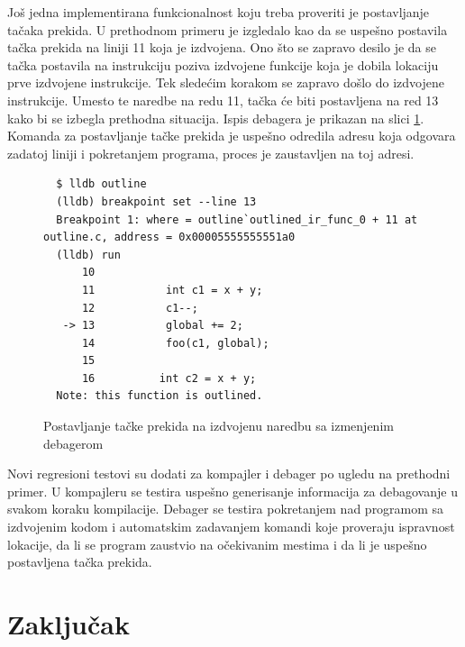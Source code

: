 \documentclass[12pt,oneside]{memoir}
\begin{document}
Još jedna implementirana funkcionalnost koju treba proveriti je postavljanje tačaka prekida.
U prethodnom primeru je izgledalo kao da se uspešno postavila tačka prekida na liniji 11 koja je izdvojena.
Ono što se zapravo desilo je da se tačka postavila na instrukciju poziva izdvojene funkcije koja je dobila lokaciju prve izdvojene instrukcije.
Tek sledećim korakom se zapravo došlo do izdvojene instrukcije.
Umesto te naredbe na redu 11, tačka će biti postavljena na red 13 kako bi se izbegla prethodna situacija.
Ispis debagera je prikazan na slici \ref{lst:outlining_debug_breakpoint_after}.
Komanda za postavljanje tačke prekida je uspešno odredila adresu koja odgovara zadatoj liniji i pokretanjem programa, proces je zaustavljen na toj adresi.

\begin{figure}[!ht]
\begin{verbatim}
  $ lldb outline
  (lldb) breakpoint set --line 13
  Breakpoint 1: where = outline`outlined_ir_func_0 + 11 at outline.c, address = 0x00005555555551a0
  (lldb) run
      10          
      11  	       int c1 = x + y;
      12  	       c1--;
   -> 13  	       global += 2;
      14  	       foo(c1, global);
      15          
      16          int c2 = x + y;
  Note: this function is outlined.
\end{verbatim}
\caption{Postavljanje tačke prekida na izdvojenu naredbu sa izmenjenim debagerom}
\label{lst:outlining_debug_breakpoint_after}
\end{figure}

Novi regresioni testovi su dodati za kompajler i debager po ugledu na prethodni primer.
U kompajleru se testira uspešno generisanje informacija za debagovanje u svakom koraku kompilacije.
Debager se testira pokretanjem nad programom sa izdvojenim kodom i automatskim zadavanjem komandi koje proveraju ispravnost lokacije, da li se program zaustvio na očekivanim mestima i da li je uspešno postavljena tačka prekida.


\chapter{Zaključak}
\label{sec:conclusion}
\end{document}
